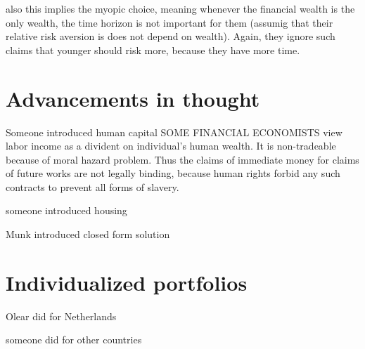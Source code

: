   also this implies the myopic choice, meaning whenever the financial wealth is the only wealth, the time horizon is not important for them (assumig that their relative risk aversion is does not depend on wealth). Again, they ignore such claims that younger should risk more, because they have more time.

   
\section{Advancements in thought}
\item Someone introduced human capital
  SOME FINANCIAL ECONOMISTS view labor income as a divident on individual's human wealth. It is non-tradeable because of moral hazard problem. Thus the claims of immediate money for claims of future works are not legally binding, because human rights forbid any such contracts to prevent all forms of slavery. 
\item someone introduced housing
\item Munk introduced closed form solution
\section{Individualized portfolios}
\item Olear did for Netherlands
\item someone did for other countries
